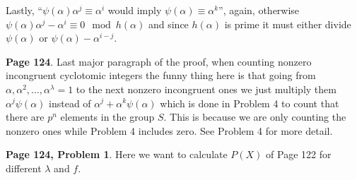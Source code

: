 \documentclass[aps,preprint,preprintnumbers,nofootinbib,showpacs,prd]{revtex4-1}
\begin{document}
Lastly, ``$\psi(\alpha)\alpha^j \equiv \alpha^i$ would imply $\psi(\alpha) \equiv \alpha^k$'', again, otherwise $\psi(\alpha)\alpha^j - \alpha^i \equiv 0 \mod{h(\alpha)}$ and since $h(\alpha)$ is prime it must either divide $\psi(\alpha)$ or $\psi(\alpha) - \alpha^{i-j}$.


{\bf Page 124}. Last major paragraph of the proof, when counting nonzero incongruent cyclotomic integers the funny thing here is that going from $\alpha,\alpha^2,\dots,\alpha^\lambda = 1$ to the next nonzero incongruent ones we just multiply them $\alpha^j\psi(\alpha)$ instead of $\alpha^j + \alpha^k\psi(\alpha)$ which is done in Problem 4 to count that there are $p^n$ elements in the group $S$. This is because we are only counting the nonzero ones while Problem 4 includes zero. See Problem 4 for more detail.

{\bf Page 124, Problem 1}. Here we want to calculate $P(X)$ of Page 122 for different $\lambda$ and $f$.
\end{document}
